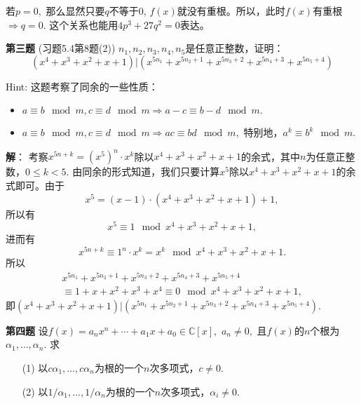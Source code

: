 若$p = 0,$ 那么显然只要$q$不等于0, $f(x)$就没有重根。所以，此时$f(x)$有重根$\Rightarrow q = 0.$ 这个关系也能用$4p^3 + 27q^2 = 0$表达。

\fi  %

\newpageorvspace

{\bf 第三题} (习题5.4第8题(2)) $n_1, n_2, n_3, n_4, n_5$是任意正整数，证明：
$$(x^4 + x^3 + x^2 + x + 1) | (x^{5n_1} + x^{5n_2+1} + x^{5n_3+2} + x^{5n_4+3} + x^{5n_5+4})$$

Hint: 这题考察了同余的一些性质：
\begin{itemize}
\item $a \equiv b \mod{m}, c \equiv d \mod{m} \Rightarrow a-c \equiv b-d \mod{m}.$
\item $a \equiv b \mod{m}, c \equiv d \mod{m} \Rightarrow ac \equiv bd \mod{m},$ 特别地，$a^k \equiv b^k \mod{m}.$
\end{itemize}

\ifIncludeAnswer

\newpageorvspace

{\bf 解}： 考察$x^{5n+k} = (x^5)^n \cdot x^k$除以$x^4 + x^3 + x^2 + x + 1$的余式，其中$n$为任意正整数，$0 \leq k < 5.$ 由同余的形式知道，我们只要计算$x^5$除以$x^4 + x^3 + x^2 + x + 1$的余式即可。由于
$$x^5 = (x-1) \cdot (x^4 + x^3 + x^2 + x + 1) + 1,$$
所以有
$$x^5 \equiv 1 \mod{x^4 + x^3 + x^2 + x + 1},$$
进而有
$$x^{5n+k} \equiv 1^n \cdot x^k = x^k \mod{x^4 + x^3 + x^2 + x + 1}.$$
所以
\begin{multline*}
x^{5n_1} + x^{5n_2+1} + x^{5n_3+2} + x^{5n_4+3} + x^{5n_5+4} \\
\equiv 1 + x + x^2 + x^3 + x^4 \equiv 0 \mod{x^4 + x^3 + x^2 + x + 1},
\end{multline*}
即$(x^4 + x^3 + x^2 + x + 1) | (x^{5n_1} + x^{5n_2+1} + x^{5n_3+2} + x^{5n_4+3} + x^{5n_5+4}).$

\fi  %

\newpageorvspace

{\bf 第四题} 设$f(x) = a_n x^n + \cdots + a_1 x + a_0 \in \mathbb{C}[x],$ $a_n \neq 0,$ 且$f(x)$的$n$个根为$\alpha_1, \ldots, \alpha_n.$ 求
\begin{itemize}
\item[(1)] 以$c\alpha_1, \ldots, c\alpha_n$为根的一个$n$次多项式，$c \neq 0.$
\item[(2)] 以$1/\alpha_1, \ldots, 1/\alpha_n$为根的一个$n$次多项式，$\alpha_i \neq 0.$
\end{itemize}

\ifIncludeAnswer

